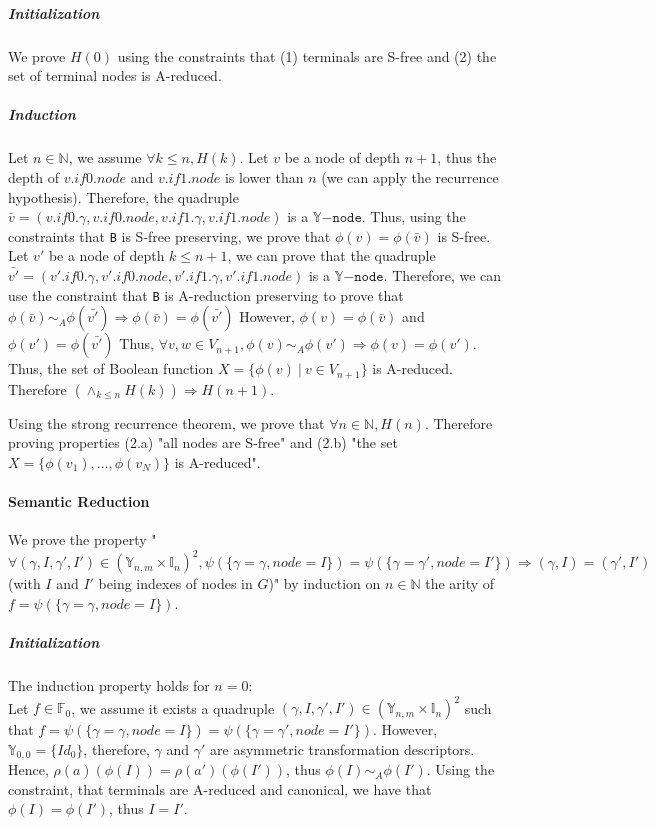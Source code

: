 \documentclass[a4paper,10pt]{article}
\newcommand{\N}{\mathbb{N}}%
\newcommand{\F}{\mathbb{F}}
\newcommand{\Y}{\mathbb{Y}}
\newcommand{\I}{\mathbb{I}}
\newcommand{\Ynode}{\Y\mathtt{-node}}
\begin{document}
\subparagraph{Initialization}
We prove $H(0)$ using the constraints that (1) terminals are S-free and (2) the set of terminal nodes is A-reduced.

\subparagraph{Induction}
Let $n\in\N$, we assume $\forall k\leq n, H(k)$.
Let $v$ be a node of depth $n+1$, thus the depth of $v.if0.node$ and $v.if1.node$ is lower than $n$ (we can apply the recurrence hypothesis).
Therefore, the quadruple $\bar{v} = (v.if0.\gamma, v.if0.node, v.if1.\gamma, v.if1.node)$ is a $\Ynode$.
Thus, using the constraints that \texttt{B} is S-free preserving, we prove that $\phi(v) = \phi(\bar{v})$ is S-free.
Let $v'$ be a node of depth $k\leq n+1$, we can prove that the quadruple $\bar{v'} = (v'.if0.\gamma, v'.if0.node, v'.if1.\gamma, v'.if1.node)$ is a $\Ynode$.
Therefore, we can use the constraint that \texttt{B} is A-reduction preserving to prove that $\phi(\bar{v}) \sim_A \phi(\bar{v'}) \Rightarrow \phi(\bar{v}) = \phi(\bar{v'})$
However, $\phi(v) = \phi(\bar{v})$ and $\phi(v') = \phi(\bar{v'})$
Thus, $\forall v, w \in V_{n+1}, \phi(v) \sim_A \phi(v') \Rightarrow \phi(v) = \phi(v')$.
Thus, the set of Boolean function $X = \{\phi(v) ~|~ v\in V_{n+1}\}$ is A-reduced.
Therefore $\left(\land_{k\leq n} H(k)\right) \Rightarrow H(n+1)$.

Using the strong recurrence theorem, we prove that $\forall n\in\N, H(n)$.
Therefore proving properties (2.a) "all nodes are S-free" and (2.b) "the set $X = \{\phi(v_1), \dots, \phi(v_N)\}$ is A-reduced".

\paragraph{Semantic Reduction}
We prove the property "$\forall (\gamma, I, \gamma', I') \in (\Y_{n, m} \times \I_n)^2, \psi(\{\gamma = \gamma, node = I\}) = \psi(\{\gamma = \gamma', node = I'\}) \Rightarrow (\gamma, I) = (\gamma', I')$ (with $I$ and $I'$ being indexes of nodes in $G$)" by induction on $n\in\N$ the arity of $f = \psi(\{\gamma = \gamma, node = I\})$.

\subparagraph{Initialization}
The induction property holds for $n = 0$:\\
Let $f\in\F_0$, we assume it exists a quadruple $(\gamma, I, \gamma', I') \in (\Y_{n, m} \times \I_n)^2$ such that $f = \psi(\{\gamma = \gamma, node = I\}) = \psi(\{\gamma = \gamma', node = I'\})$.
However, $\Y_{0, 0} = \{Id_0\}$, therefore, $\gamma$ and $\gamma'$ are asymmetric transformation descriptors.
Hence, $\rho(a)(\phi(I)) = \rho(a')(\phi(I'))$, thus $\phi(I) \sim_A \phi(I')$.
Using the constraint, that terminals are A-reduced and canonical, we have that $\phi(I) = \phi(I')$, thus $I = I'$.
\end{document}
